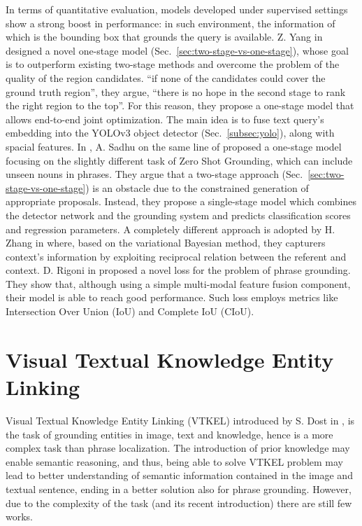 In terms of quantitative evaluation, models developed under supervised
settings show a strong boost in performance: in such environment, the
information of which is the bounding box that grounds the query is
available. Z. Yang \etal{} in \cite{yang2019fast} designed a novel
one-stage model (Sec.~\ref{sec:two-stage-vs-one-stage}), whose goal is
to outperform existing two-stage methods and overcome the problem of
the quality of the region candidates. ``if none of the candidates
could cover the ground truth region'', they argue, ``there is no hope
in the second stage to rank the right region to the top''. For this
reason, they propose a one-stage model that allows end-to-end joint
optimization. The main idea is to fuse text query's embedding into the
YOLOv3 object detector (Sec.~\ref{subsec:yolo}), along with spacial
features. In \cite{sadhu2019zero}, A. Sadhu \etal{} on the same line
of \cite{yang2019fast} proposed a one-stage model focusing on the
slightly different task of Zero Shot Grounding, which can include
unseen nouns in phrases. They argue that a two-stage approach
(Sec.~\ref{sec:two-stage-vs-one-stage}) is an obstacle due to the
constrained generation of appropriate proposals. Instead, they propose
a single-stage model which combines the detector network and the
grounding system and predicts classification scores and regression
parameters. A completely different approach is adopted by H. Zhang
\etal{} in \cite{zhang2018grounding} where, based on the variational
Bayesian method, they capturers context's information by exploiting
reciprocal relation between the referent and context. D. Rigoni
\etal{} in \cite{rigoni2021better} proposed a novel loss for the
problem of phrase grounding. They show that, although using a simple
multi-modal feature fusion component, their model is able to reach
good performance. Such loss employs metrics like Intersection Over
Union (IoU) and Complete IoU (CIoU).

\section{Visual Textual Knowledge Entity Linking}

Visual Textual Knowledge Entity Linking (VTKEL) introduced by S. Dost
\etal{} in \cite{dost2020jointly, dost2020vtkel, dost2020visual}, is
the task of grounding entities in image, text and knowledge, hence is
a more complex task than phrase localization. The introduction of
prior knowledge may enable semantic reasoning, and thus, being able to
solve VTKEL problem may lead to better understanding of semantic
information contained in the image and textual sentence, ending in a
better solution also for phrase grounding. However, due to the
complexity of the task (and its recent introduction) there are still
few works. 

